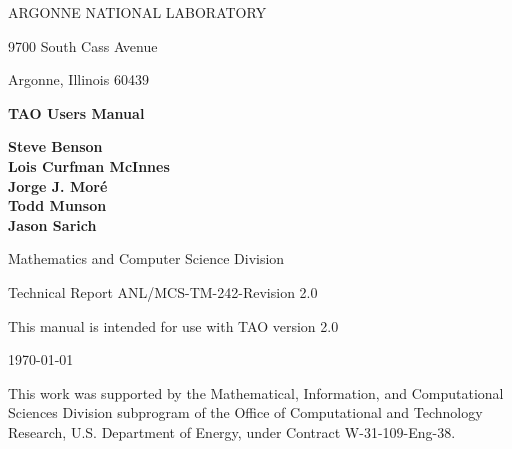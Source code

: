 
\vspace{1.75in}

\begin{center}

ARGONNE NATIONAL LABORATORY

9700 South Cass Avenue

Argonne, Illinois  60439

\vspace{1.5in}

{\Large
{\bf 
TAO Users Manual
}
}

\vspace{.5in}

{\bf Steve Benson \\ Lois Curfman McInnes \\ Jorge J. Mor\'e \\ Todd Munson \\ Jason Sarich}

\vspace{.5in}

Mathematics and Computer Science Division

\vspace{.25in}

Technical Report  ANL/MCS-TM-242-Revision 2.0

\vspace{.25in}

This manual is intended for use with TAO version 2.0

\vspace{1.0in}

\today
\end{center}

\vspace{0.75in}

\par\noindent
This work was supported by the Mathematical, Information,
and Computational Sciences Division subprogram of the
Office of Computational and Technology Research,
U.S. Department of Energy, under Contract W-31-109-Eng-38.

